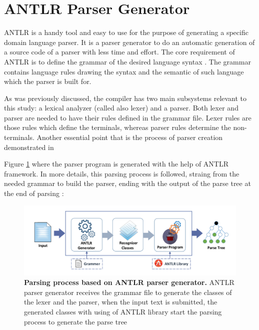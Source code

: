 \section{ANTLR Parser Generator}
\label{sec:bck_ANTLR}

ANTLR is a handy tool and easy to use for the purpose of generating a specific domain language parser. It is a parser generator to do an automatic generation of a source code of a parser with less time and effort. The core requirement of ANTLR is to define the grammar of the desired language syntax . The grammar contains language rules  drawing the syntax and the semantic of such  language which the parser is built for. 
\par
 As was previously discussed, the compiler has two main subsystems relevant to this study: a lexical analyzer (called also lexer) and a parser. Both lexer and parser are needed to have their rules defined in the grammar file. Lexer rules are those rules which define the terminals, whereas parser rules determine the non-terminals. Another essential point that is the process of parser creation  demonstrated in {Figure \ref{Fig:ANTLR} where the parser program is generated with the help of ANTLR framework. In more details, this parsing process \cite{ANTLR:Tool:Online} is followed, straing from the needed grammar to build the parser, ending with the output of the parse tree at the end of parsing :

\begin{figure}[td]
	\begin{center}
		\includegraphics[scale=0.6]{images/ANTLR}
		\caption{\textbf{Parsing process based on ANTLR parser generator\cite{ANTLR:Tool:Online}.} ANTLR parser generator receives the grammar file to generate the classes of the lexer and the parser, when the input text is submitted, the generated classes with using of ANTLR library start the parsing process to generate the parse tree}
		\label{Fig:ANTLR}
	\end{center}
\end{figure}


\begin{enumerate}
		

\end{enumerate}}
